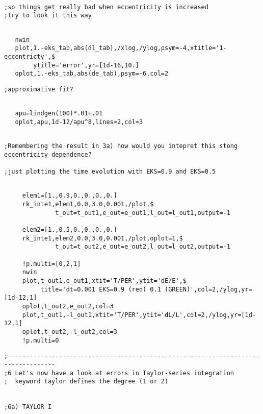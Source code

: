 \documentclass[a4paper,12pt]{article}
\def\red{\color{red}}
\def\black{\color{RGBblack}}
\begin{document}
\black
\begin{verbatim}

;so things get really bad when eccentricity is increased
;try to look it this way

\end{verbatim}
\red
\begin{verbatim}

   nwin
   plot,1.-eks_tab,abs(dl_tab),/xlog,/ylog,psym=-4,xtitle='1-eccentricty',$
        ytitle='error',yr=[1d-16,10.]
   oplot,1.-eks_tab,abs(de_tab),psym=-6,col=2

\end{verbatim}
\black
\begin{verbatim}
;approximative fit?

\end{verbatim}
\red
\begin{verbatim}

   apu=lindgen(100)*.01+.01
   oplot,apu,1d-12/apu^8,lines=2,col=3

\end{verbatim}
\black
\begin{verbatim}

;Remembering the result in 3a) how would you intepret this stong eccentricity dependence?

;just plotting the time evolution with EKS=0.9 and EKS=0.5

\end{verbatim}
\red
\begin{verbatim}

     elem1=[1.,0.9,0.,0.,0.,0.]
     rk_inte1,elem1,0.0,3.0,0.001,/plot,$
              t_out=t_out1,e_out=e_out1,l_out=l_out1,output=-1

     elem2=[1.,0.5,0.,0.,0.,0.]
     rk_inte1,elem2,0.0,3.0,0.001,/plot,oplot=1,$
              t_out=t_out2,e_out=e_out2,l_out=l_out2,output=-1

     !p.multi=[0,2,1]
     nwin
     plot,t_out1,e_out1,xtit='T/PER',ytit='dE/E',$
          title='dt=0.001 EKS=0.9 (red) 0.1 (GREEN)',col=2,/ylog,yr=[1d-12,1]
     oplot,t_out2,e_out2,col=3
     plot,t_out1,-l_out1,xtit='T/PER',ytit='dL/L',col=2,/ylog,yr=[1d-12,1]
     oplot,t_out2,-l_out2,col=3
     !p.multi=0

\end{verbatim}
\black
\begin{verbatim}
;-----------------------------------------------------------------------------------
;6 Let's now have a look at errors in Taylor-series integration
;  keyword taylor defines the degree (1 or 2)

     
;6a) TAYLOR I

\end{verbatim}
\end{document}
